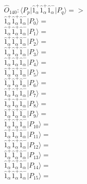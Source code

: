 \documentclass[14pt]{article}
\begin{document}
    $\hat{O}_{140}:  \langle{P_p}\vert \hat{1}_{\alpha}^{+}\hat{1}_{\alpha}^{+}\hat{1}_{\alpha}^{-} \vert{P_q}\rangle => $ \\ 
    $ \hat{1}_{\alpha}^{+}\hat{1}_{\alpha}^{+}\hat{1}_{\alpha}^{-} \vert{P_{0}}\rangle =  $ \\ 
    $ \hat{1}_{\alpha}^{+}\hat{1}_{\alpha}^{+}\hat{1}_{\alpha}^{-} \vert{P_{1}}\rangle =  $ \\ 
    $ \hat{1}_{\alpha}^{+}\hat{1}_{\alpha}^{+}\hat{1}_{\alpha}^{-} \vert{P_{2}}\rangle =  $ \\ 
    $ \hat{1}_{\alpha}^{+}\hat{1}_{\alpha}^{+}\hat{1}_{\alpha}^{-} \vert{P_{3}}\rangle =  $ \\ 
    $ \hat{1}_{\alpha}^{+}\hat{1}_{\alpha}^{+}\hat{1}_{\alpha}^{-} \vert{P_{4}}\rangle =  $ \\ 
    $ \hat{1}_{\alpha}^{+}\hat{1}_{\alpha}^{+}\hat{1}_{\alpha}^{-} \vert{P_{5}}\rangle =  $ \\ 
    $ \hat{1}_{\alpha}^{+}\hat{1}_{\alpha}^{+}\hat{1}_{\alpha}^{-} \vert{P_{6}}\rangle =  $ \\ 
    $ \hat{1}_{\alpha}^{+}\hat{1}_{\alpha}^{+}\hat{1}_{\alpha}^{-} \vert{P_{7}}\rangle =  $ \\ 
    $ \hat{1}_{\alpha}^{+}\hat{1}_{\alpha}^{+}\hat{1}_{\alpha}^{-} \vert{P_{8}}\rangle =  $ \\ 
    $ \hat{1}_{\alpha}^{+}\hat{1}_{\alpha}^{+}\hat{1}_{\alpha}^{-} \vert{P_{9}}\rangle =  $ \\ 
    $ \hat{1}_{\alpha}^{+}\hat{1}_{\alpha}^{+}\hat{1}_{\alpha}^{-} \vert{P_{10}}\rangle =  $ \\ 
    $ \hat{1}_{\alpha}^{+}\hat{1}_{\alpha}^{+}\hat{1}_{\alpha}^{-} \vert{P_{11}}\rangle =  $ \\ 
    $ \hat{1}_{\alpha}^{+}\hat{1}_{\alpha}^{+}\hat{1}_{\alpha}^{-} \vert{P_{12}}\rangle =  $ \\ 
    $ \hat{1}_{\alpha}^{+}\hat{1}_{\alpha}^{+}\hat{1}_{\alpha}^{-} \vert{P_{13}}\rangle =  $ \\ 
    $ \hat{1}_{\alpha}^{+}\hat{1}_{\alpha}^{+}\hat{1}_{\alpha}^{-} \vert{P_{14}}\rangle =  $ \\ 
    $ \hat{1}_{\alpha}^{+}\hat{1}_{\alpha}^{+}\hat{1}_{\alpha}^{-} \vert{P_{15}}\rangle =  $ \\ 
    
\end{document}
